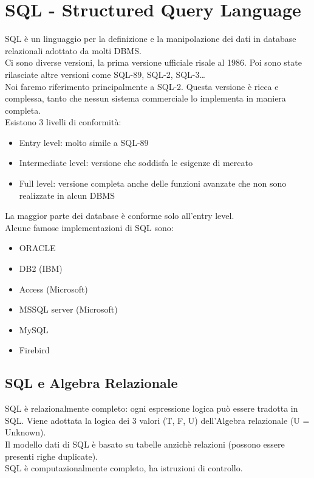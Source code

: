 \chapter{SQL - Structured Query Language}
SQL è un linguaggio per la definizione e la manipolazione dei dati
in database relazionali adottato da molti DBMS. \\
Ci sono diverse versioni, la prima versione ufficiale risale al 1986.
Poi sono state rilasciate altre versioni come SQL-89, SQL-2, SQL-3\dots\\
Noi faremo riferimento principalmente a SQL-2. Questa versione è ricca e complessa,
tanto che nessun sistema commerciale lo implementa in maniera completa.\\
Esistono 3 livelli di conformità:
\begin{itemize}
  \item Entry level: molto simile a SQL-89
  \item Intermediate level: versione che soddisfa le esigenze di mercato
  \item Full level: versione completa anche delle funzioni avanzate che non sono realizzate
  in alcun DBMS
\end{itemize}
La maggior parte dei database è conforme solo all'entry level.\\
Alcune famose implementazioni di SQL sono:
\begin{itemize}
    \item ORACLE
    \item DB2 (IBM)
    \item Access (Microsoft)
    \item MSSQL server (Microsoft)
    \item MySQL
    \item Firebird
\end{itemize}
\section{SQL e Algebra Relazionale}
SQL è relazionalmente completo: ogni espressione logica può essere tradotta in SQL. 
Viene adottata la logica dei 3 valori (T, F, U) dell'Algebra relazionale (U = Unknown).\\
Il modello dati di SQL è basato su tabelle anzichè relazioni (possono essere presenti righe duplicate).\\
SQL è computazionalmente completo, ha istruzioni di controllo.
